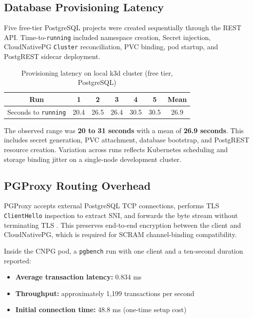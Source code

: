 \subsection{Database Provisioning Latency}

Five free-tier PostgreSQL projects were created sequentially through the REST API. Time-to-\texttt{running} included namespace creation, Secret injection, CloudNativePG \texttt{Cluster} reconciliation, PVC binding, pod startup, and PostgREST sidecar deployment.

\begin{table}[H]
    \centering
    \renewcommand{\arraystretch}{1.3}
    \begin{tabular}{|c|c|c|c|c|c|c|}
    \hline
    \textbf{Run} & 1 & 2 & 3 & 4 & 5 & \textbf{Mean} \\
    \hline
    Seconds to \texttt{running} & 20.4 & 26.5 & 26.4 & 30.5 & 30.5 & 26.9 \\
    \hline
    \end{tabular}
    \caption{Provisioning latency on local k3d cluster (free tier, PostgreSQL)}
    \label{tab:provisioning_latency}
\end{table}

The observed range was \textbf{20 to 31 seconds} with a mean of \textbf{26.9 seconds}. This includes secret generation, PVC attachment, database bootstrap, and PostgREST resource creation. Variation across runs reflects Kubernetes scheduling and storage binding jitter on a single-node development cluster.

\subsection{PGProxy Routing Overhead}

PGProxy accepts external PostgreSQL TCP connections, performs TLS \texttt{ClientHello} inspection to extract SNI, and forwards the byte stream without terminating TLS \cite{go_net_performance}. This preserves end-to-end encryption between the client and CloudNativePG, which is required for SCRAM channel-binding compatibility.

Inside the CNPG pod, a \texttt{pgbench} run with one client and a ten-second duration reported:

\begin{itemize}
    \item \textbf{Average transaction latency:} 0.834 ms
    \item \textbf{Throughput:} approximately 1{,}199 transactions per second
    \item \textbf{Initial connection time:} 48.8 ms (one-time setup cost)
\end{itemize}

